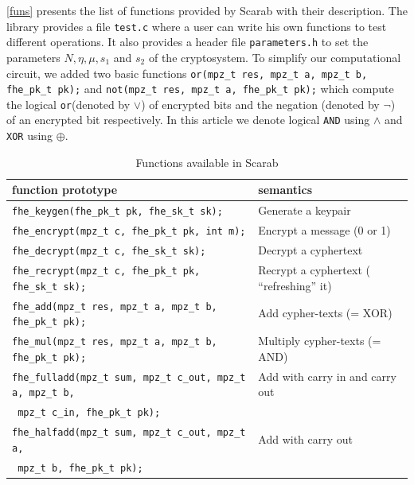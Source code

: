 \documentclass{acm_proc_article-sp}
\begin{document}
\autoref{funs} presents the list of functions provided by Scarab with their description. The library provides a file \texttt{test.c} where a user can write his own functions to test different operations. It also provides a header file \texttt{parameters.h} to set the parameters $N, \eta, \mu, s_1$ and $ s_2$ of the cryptosystem. To simplify our computational circuit, we added two basic functions \texttt{or(mpz\_t res, mpz\_t a, mpz\_t b, fhe\_pk\_t pk);} and \texttt{not(mpz\_t res, mpz\_t a, fhe\_pk\_t pk);} which compute the logical \texttt{or}(denoted by $\vee$) of encrypted bits and the negation (denoted by $\neg$) of an encrypted bit respectively. In this article we denote logical \texttt{AND} using $\wedge$ and \texttt{XOR} using $\oplus$.

\begin{table}
\centering
\caption{Functions available in Scarab}
\begin{tabular}{|l|l||}
  \hline
  \textbf{function prototype} & \textbf{semantics}  \\
  \hline
 \texttt{fhe\_keygen(fhe\_pk\_t pk, fhe\_sk\_t sk);}  & 	Generate a keypair \\
\texttt{fhe\_encrypt(mpz\_t c, fhe\_pk\_t pk, int m);} &	Encrypt a message (0 or 1) \\
\texttt{fhe\_decrypt(mpz\_t c, fhe\_sk\_t sk);} &	Decrypt a cyphertext\\
\texttt{fhe\_recrypt(mpz\_t c, fhe\_pk\_t pk, fhe\_sk\_t sk); }	&Recrypt a cyphertext ( ``refreshing'' it) \\
\texttt{fhe\_add(mpz\_t res, mpz\_t a, mpz\_t b, fhe\_pk\_t pk);} &	Add cypher-texts (= XOR) \\
\texttt{fhe\_mul(mpz\_t res, mpz\_t a, mpz\_t b, fhe\_pk\_t pk);} &	Multiply cypher-texts (= AND) \\
\texttt{fhe\_fulladd(mpz\_t sum, mpz\_t c\_out, mpz\_t a, mpz\_t b,} &	Add with carry in and carry out \\
\phantom{x}\hspace{12ex} \texttt{ mpz\_t c\_in, fhe\_pk\_t pk);} & \\
\texttt{fhe\_halfadd(mpz\_t sum, mpz\_t c\_out, mpz\_t a,} &	Add with carry out \\
\phantom{x}\hspace{12ex} \texttt{ mpz\_t b, fhe\_pk\_t pk);} & \\  
\hline
\end{tabular}
\label{funs}
\end{table}
\end{document}
